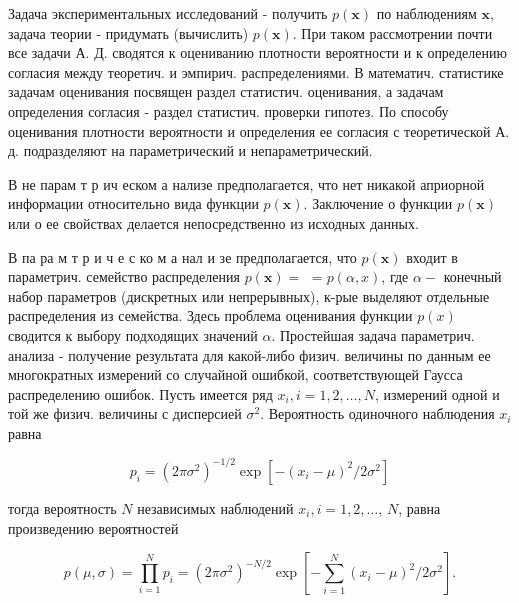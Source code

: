 \documentclass[10pt]{article}
\begin{document}
Задача экспериментальных исследований - получить $p(\boldsymbol{x})$ по наблюдениям $\boldsymbol{x}$, задача теории - придумать (вычислить) $p(\boldsymbol{x})$. При таком рассмотрении почти все задачи А. Д. сводятся к оцениванию плотности вероятности и к определению согласия между теоретич. и эмпирич. распределениями. В математич. статистике задачам оценивания посвящен раздел статистич. оценивания, а задачам определения согласия - раздел статистич. проверки гипотез. По способу оценивания плотности вероятности и определения ее согласия с теоретической А. д. подразделяют на параметрический и непараметрический.



В не парам т р ич еском а нализе предполагается, что нет никакой априорной информации относительно вида функции $p(\boldsymbol{x})$. Заключение о функции $p(\boldsymbol{x})$ или о ее свойствах делается непосредственно из исходных данных.



В па ра м т р и ч е с ко м а нал и зе предполагается, что $p(\boldsymbol{x})$ входит в параметрич. семейство распределения $p(\boldsymbol{x})=$ $=p(\alpha, x)$, где $\alpha-$ конечный набор параметров (дискретных или непрерывных), к-рые выделяют отдельные распределения из семейства. Здесь проблема оценивания функции $p(x)$ сводится к выбору подходящих значений $\alpha$. Простейшая задача параметрич. анализа - получение результата для какой-либо физич. величины по данным ее многократных измерений со случайной ошибкой, соответствующей Гаусса распределению ошибок. Пусть имеется ряд $x_{i}, i=1,2, \ldots, N$, измерений одной и той же физич. величины с дисперсией $\sigma^{2}$. Вероятность одиночного наблюдения $x_{i}$ равна



\[

p_{i}=\left(2 \pi \sigma^{2}\right)^{-1 / 2} \exp \left[-\left(x_{i}-\mu\right)^{2} / 2 \sigma^{2}\right]

\]



тогда вероятность $N$ независимых наблюдений $x_{i}, i=1,2, \ldots$, $N$, равна произведению вероятностей



\[

p(\mu, \sigma)=\prod_{i=1}^{N} p_{i}=\left(2 \pi \sigma^{2}\right)^{-N / 2} \exp \left[-\sum_{i=1}^{N}\left(x_{i}-\mu\right)^{2} / 2 \sigma^{2}\right] .

\]
\end{document}
